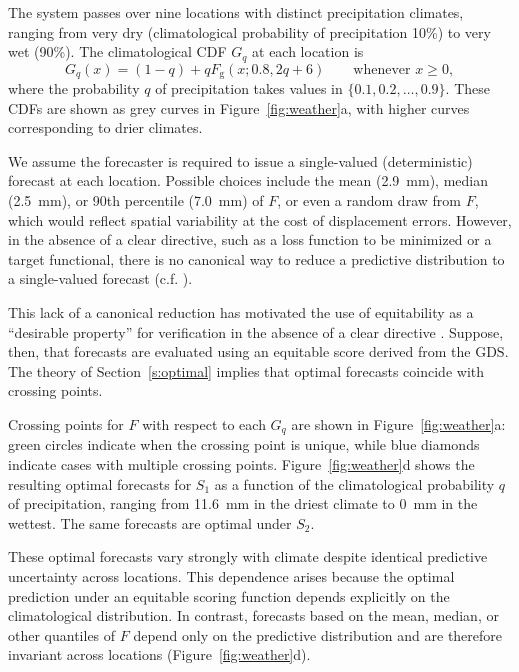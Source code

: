 \documentclass[10pt]{article} %
\theoremstyle{theorem}
\theoremstyle{definition}
\newcommand{\GDS}{\mathrm{GDS}}
\begin{document}
The system passes over nine locations with distinct precipitation climates, ranging from very dry (climatological probability of precipitation 10\%) to very wet (90\%). The climatological CDF $G_q$ at each location is
\[
G_q(x)= (1-q) + q F_\mathrm{g}(x;0.8,2q+6) \qquad\text{whenever }x\geq0,
\]
where the probability $q$ of precipitation takes values in $\{0.1,0.2,\ldots,0.9\}$. These CDFs are shown as grey curves in Figure~\ref{fig:weather}a, with higher curves corresponding to drier climates.

We assume the forecaster is required to issue a single-valued (deterministic) forecast at each location. Possible choices include the mean (2.9~mm), median (2.5~mm), or 90th percentile (7.0~mm) of $F$, or even a random draw from $F$, which would reflect spatial variability at the cost of displacement errors. However, in the absence of a clear directive, such as a loss function to be minimized or a target functional, there is no canonical way to reduce a predictive distribution to a single-valued forecast (c.f. \citealt{murphy1985forecast, gneiting2011making}).

This lack of a canonical reduction has motivated the use of equitability as a ``desirable property'' for verification in the absence of a clear directive \citep{gandin1992equitable, Livezey2003Categorical, hogan2010equitability}. Suppose, then, that forecasts are evaluated using an equitable score derived from the $\GDS$. The theory of Section~\ref{s:optimal} implies that optimal forecasts coincide with crossing points.

Crossing points for $F$ with respect to each $G_q$ are shown in Figure~\ref{fig:weather}a: green circles indicate when the crossing point is unique, while blue diamonds indicate cases with multiple crossing points. Figure~\ref{fig:weather}d shows the resulting optimal forecasts for $S_1$ as a function of the climatological probability $q$ of precipitation, ranging from 11.6~mm in the driest climate to 0~mm in the wettest. The same forecasts are optimal under $S_2$.

These optimal forecasts vary strongly with climate despite identical predictive uncertainty across locations. This dependence arises because the optimal prediction under an equitable scoring function depends explicitly on the climatological distribution. In contrast, forecasts based on the mean, median, or other quantiles of $F$ depend only on the predictive distribution and are therefore invariant across locations (Figure~\ref{fig:weather}d).
\end{document}
